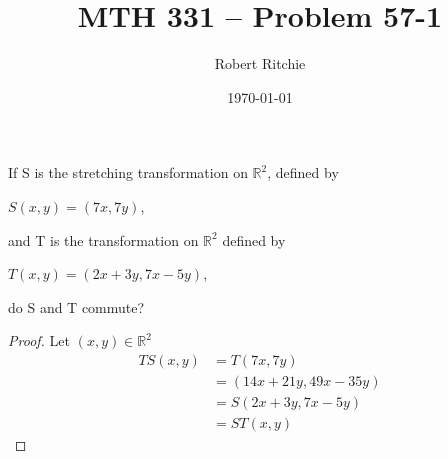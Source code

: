 \documentclass[11pt]{article}
\begin{document}
\author{Robert Ritchie}
\title{MTH 331 -- Problem 57-1}
\date{\today}

\maketitle

If S is the stretching transformation on $\mathbb{R}^{2}$, defined by \begin{center}
$S(x,y)=(7x,7y)$, 
\end{center} and T is the transformation on $\mathbb{R}^2$ defined by \begin{center} $T(x,y)=(2x+3y,7x-5y)$,\end{center} do S and T commute?
\begin{proof} 
Let $(x,y)\in\mathbb{R}^2$
\begin{align*}
TS(x,y)&=T(7x,7y)\\
&=(14x+21y,49x-35y)\\
&=S(2x+3y,7x-5y)\\
&=ST(x,y)
\end{align*}

\end{proof}
\end{document}
